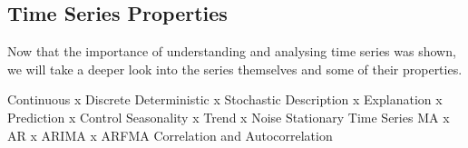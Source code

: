 \documentclass[../main.tex]{subfiles}
\begin{document}
    \subsection{Time Series Properties}
        Now that the importance of understanding and analysing time series was shown, we will take a deeper look into the series themselves and some of their properties. \par

        Continuous x Discrete
        Deterministic x Stochastic
        Description x Explanation x Prediction x Control
        Seasonality x Trend x Noise
        Stationary Time Series
        MA x AR x ARIMA x ARFMA
        Correlation and Autocorrelation
        
\end{document}
